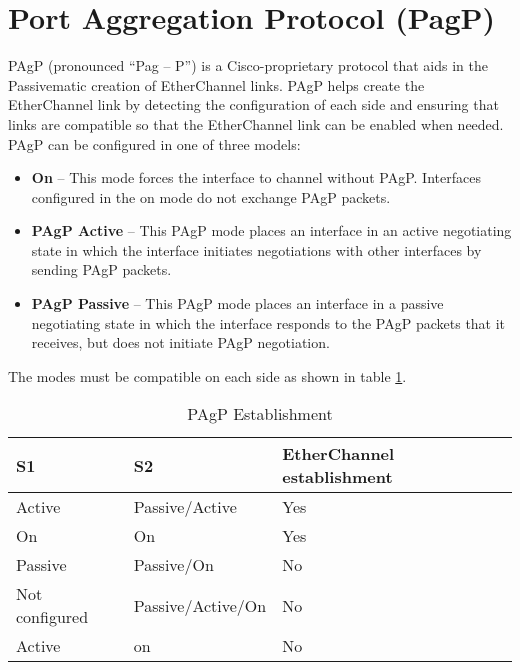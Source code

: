 \section{Port Aggregation Protocol (PagP)}
PAgP (pronounced “Pag – P”) is a Cisco-proprietary protocol that aids in the Passivematic creation of EtherChannel links. PAgP helps create the EtherChannel link by detecting the configuration of each side and ensuring that links are compatible so that the EtherChannel link can be enabled when needed. PAgP can be configured in one of three models:
\begin{itemize}
\item \textbf{On} -- This mode forces the interface to channel without PAgP. Interfaces configured in the on mode do not exchange PAgP packets.
\item \textbf{PAgP Active} -- This PAgP mode places an interface in an active negotiating state in which the interface initiates negotiations with other interfaces by sending PAgP packets.
\item \textbf{PAgP Passive} -- This PAgP mode places an interface in a passive negotiating state in which the interface responds to the PAgP packets that it receives, but does not initiate PAgP negotiation.
\end{itemize}
The modes must be compatible on each side as shown in table \ref{PAgP-mode}.
\begin{table}[htbp]
\caption{PAgP Establishment}
\label{PAgP-mode}
\begin{tabular}{|l|l|l|}
\hline
S1             & S2                & EtherChannel establishment \\ \hline
Active      & Passive/Active    & Yes                        \\ \hline
On             & On                & Yes                        \\ \hline
Passive           & Passive/On           & No                         \\ \hline
Not configured & Passive/Active/On & No                         \\ \hline
Active      & on                & No                         \\ \hline
\end{tabular}
\end{table}

